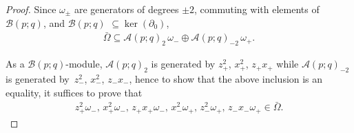 \documentclass[10pt,a4paper]{amsart}
\numberwithin{equation}{section}
\def\Weyl#1#2{{\mathcal{B}}(#1;#2)}
\def\AWeyl#1#2{{\mathcal{A}}(#1;#2)}
\begin{document}
\begin{proof}
Since $\omega_\pm$ are generators of degrees $\pm 2$, commuting with elements of $\Weyl p q$, and $\Weyl p q$ $\subseteq \ker(\partial_0)$,
\begin{gather*}
\bar\Omega \subseteq \AWeyl p q_{2}\,\omega_- \oplus \AWeyl p q_{-2}\,\omega_+.
\end{gather*}

As a $\Weyl p q$-module, $ \AWeyl p q_{2}$ is generated by $z_+^2$, $x_+^2$, $z_+x_+$ while $ \AWeyl p q_{-2}$ is generated by~$z_-^2$, $x_-^2$, $z_-x_-$, hence to show that the above inclusion is an equality, it suf\/f\/ices to prove that
\begin{gather*}
z_+^2\omega_- ,\, x_+^2\omega_-,\, z_+x_+\omega_-,\,x_-^2 \omega_+,\, z_-^2\omega_+,\, z_-x_- \omega_+ \in \bar\Omega.
\end{gather*}


\end{proof}
\end{document}
